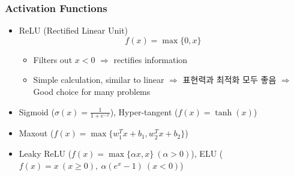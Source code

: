 \subsubsection*{Activation Functions}
\begin{itemize}
    \item ReLU (Rectified Linear Unit)
    \begin{equation}
        f(x)=\max\{0,x\}
    \end{equation}
    \begin{itemize}
        \item Filters out $x<0$ $\Rightarrow$ rectifies information
        \item Simple calculation, similar to linear $\Rightarrow$ 표현력과 최적화 모두 좋음 $\Rightarrow$ Good choice for many problems
    \end{itemize}
    \item Sigmoid ($\sigma(x)=\frac{1}{1+e^{-x}}$), Hyper-tangent ($f(x)=\tanh(x)$)
    \item Maxout ($f(x)=\max\{w_1^Tx+b_1,w_2^Tx+b_2\}$)
    \item Leaky ReLU ($f(x)=\max\{\alpha x,x\}~(\alpha>0)$), ELU ($f(x)=x~(x\geq 0),~\alpha(e^x-1)~(x<0)$)
\end{itemize}
\begin{figures}
\end{figures}
